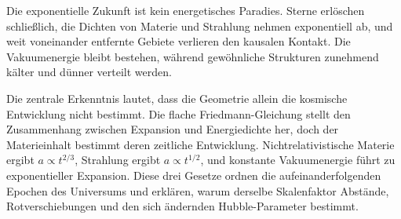 Die exponentielle Zukunft ist kein energetisches Paradies. Sterne erlöschen schließlich, die Dichten von Materie und Strahlung nehmen exponentiell ab, und weit voneinander entfernte Gebiete verlieren den kausalen Kontakt. Die Vakuumenergie bleibt bestehen, während gewöhnliche Strukturen zunehmend kälter und dünner verteilt werden.

\begin{classroomqa}
\end{classroomqa}

Die zentrale Erkenntnis lautet, dass die Geometrie allein die kosmische Entwicklung nicht bestimmt. Die flache Friedmann-Gleichung stellt den Zusammenhang zwischen Expansion und Energiedichte her, doch der Materieinhalt bestimmt deren zeitliche Entwicklung. Nichtrelativistische Materie ergibt \(a\propto t^{2/3}\), Strahlung ergibt \(a\propto t^{1/2}\), und konstante Vakuumenergie führt zu exponentieller Expansion. Diese drei Gesetze ordnen die aufeinanderfolgenden Epochen des Universums und erklären, warum derselbe Skalenfaktor Abstände, Rotverschiebungen und den sich ändernden Hubble-Parameter bestimmt.
